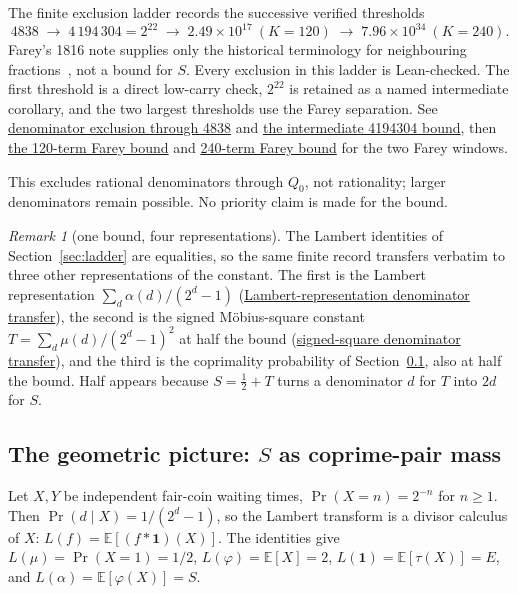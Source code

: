 \documentclass[11pt]{article}
\newcommand{\commit}{ebc98ee71f6819bd9fe344a0bb343542c604e533}
\newcommand{\repobase}{https://github.com/wcook04/plectis-lean-erdos249-257/blob/\commit}
\newcommand{\PK}{Erdos249257}
\newcommand{\lword}[4]{\href{\repobase/\PK/#1\#L#2}{#4}}
\theoremstyle{definition}
\theoremstyle{remark}
\newtheorem*{remark}{Remark}
\newcommand{\ph}{\varphi}
\newcommand{\Qzero}{Q_0}
\begin{document}
The finite exclusion ladder records the successive verified thresholds
\[
4838 \;\to\; 4\,194\,304 = 2^{22} \;\to\; 2.49\times10^{17}\ (K{=}120)
\;\to\; 7.96\times10^{34}\ (K{=}240).
\]
Farey's 1816 note supplies only the historical terminology for neighbouring
fractions~\cite{farey1816}, not a bound for \(S\).  Every exclusion in this
ladder is Lean-checked.  The first threshold is a direct low-carry check,
$2^{22}$ is retained as a named intermediate corollary, and the two largest
thresholds use the Farey separation. See
\lword{CertificateKernel.lean}{15347}{tsum_totient_div_pow_two_ne_ratCast_of_den_le_4838}{denominator exclusion through 4838}
and \lword{CertificateKernel.lean}{18029}{tsum_totient_div_pow_two_ne_ratCast_of_den_le_4194304}{the intermediate 4194304 bound},
then \lword{GapFareyBound.lean}{88}{gap_check_window_1_120_le_248672326362367909}{the 120-term Farey bound} and
\lword{GapFareyBound.lean}{176}{gap_check_window_1_240_le_79639646646701375323355774875831053}{240-term Farey bound}
for the two Farey windows.

This excludes rational denominators through $\Qzero$, not rationality;
larger denominators remain possible.  No priority claim is made for the bound.

\begin{remark}[one bound, four representations]
The Lambert identities of Section~\ref{sec:ladder} are equalities, so the same
finite record transfers verbatim to three other representations of the constant.
The first is the Lambert representation $\sum_d \alpha(d)/(2^d-1)$
(\lword{CertificateKernel.lean}{18145}{tsum_primWeight_div_two_pow_sub_one_ne_int_div_of_den_le_79639646646701375323355774875831053}{Lambert-representation denominator transfer}),
the second is the signed M\"obius-square constant $T=\sum_d\mu(d)/(2^d-1)^2$ at half the bound
(\lword{CertificateKernel.lean}{18159}{tsum_moebius_div_two_pow_sub_one_sq_ne_int_div_of_den_le_39819823323350687661677887437915526}{signed-square denominator transfer}),
and the third is the coprimality probability of Section~\ref{sec:geom}, also at half the bound.
Half appears because $S=\tfrac12+T$ turns a denominator $d$ for $T$ into $2d$ for $S$.
\end{remark}

\subsection{The geometric picture: $S$ as coprime-pair mass}\label{sec:geom}

Let $X,Y$ be independent fair-coin waiting times, $\Pr(X=n)=2^{-n}$ for $n\ge1$.
Then $\Pr(d\mid X)=1/(2^d-1)$, so the Lambert transform is a divisor calculus of
$X$: $L(f)=\mathbb E[(f*\mathbf 1)(X)]$.  The identities give $L(\mu)=\Pr(X=1)=1/2$,
$L(\ph)=\mathbb E[X]=2$, $L(\mathbf 1)=\mathbb E[\tau(X)]=E$, and
$L(\alpha)=\mathbb E[\ph(X)]=S$.
\end{document}
